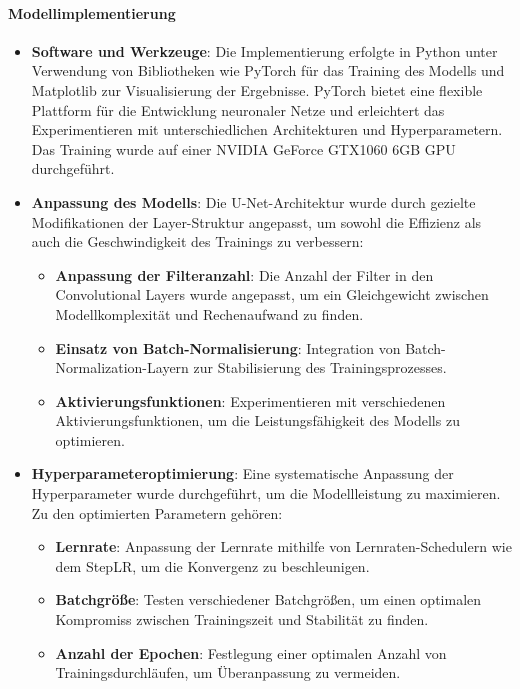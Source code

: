 \paragraph{Modellimplementierung}
\begin{itemize} 

\item \textbf{Software und Werkzeuge}: Die Implementierung erfolgte in Python unter Verwendung von Bibliotheken wie PyTorch für das Training des Modells und Matplotlib zur Visualisierung der Ergebnisse. PyTorch bietet eine flexible Plattform für die Entwicklung neuronaler Netze und erleichtert das Experimentieren mit unterschiedlichen Architekturen und Hyperparametern. Das Training wurde auf einer NVIDIA GeForce GTX1060 6GB GPU durchgeführt.

\item \textbf{Anpassung des Modells}: Die U-Net-Architektur wurde durch gezielte Modifikationen der Layer-Struktur angepasst, um sowohl die Effizienz als auch die Geschwindigkeit des Trainings zu verbessern:
    \begin{itemize}
        \item \textbf{Anpassung der Filteranzahl}: Die Anzahl der Filter in den Convolutional Layers wurde angepasst, um ein Gleichgewicht zwischen Modellkomplexität und Rechenaufwand zu finden.
        \item \textbf{Einsatz von Batch-Normalisierung}: Integration von Batch-Normalization-Layern zur Stabilisierung des Trainingsprozesses.
        \item \textbf{Aktivierungsfunktionen}: Experimentieren mit verschiedenen Aktivierungsfunktionen, um die Leistungsfähigkeit des Modells zu optimieren.
    \end{itemize}

\item \textbf{Hyperparameteroptimierung}: Eine systematische Anpassung der Hyperparameter wurde durchgeführt, um die Modellleistung zu maximieren. Zu den optimierten Parametern gehören:
    \begin{itemize}
        \item \textbf{Lernrate}: Anpassung der Lernrate mithilfe von Lernraten-Schedulern wie dem StepLR, um die Konvergenz zu beschleunigen.
        \item \textbf{Batchgröße}: Testen verschiedener Batchgrößen, um einen optimalen Kompromiss zwischen Trainingszeit und Stabilität zu finden.
        \item \textbf{Anzahl der Epochen}: Festlegung einer optimalen Anzahl von Trainingsdurchläufen, um Überanpassung zu vermeiden.
    \end{itemize}

\end{itemize}
    
